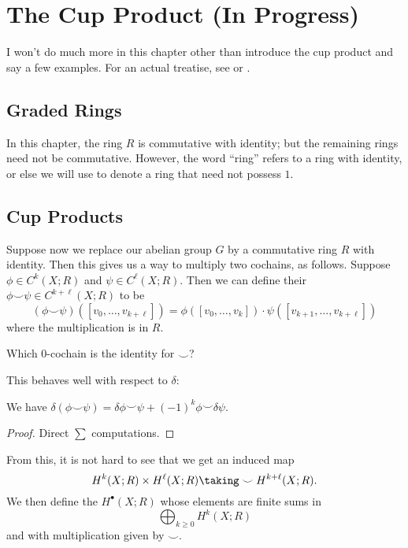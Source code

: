 \chapter{The Cup Product (In Progress)}
I won't do much more in this chapter other than
introduce the cup product and say a few examples.
For an actual treatise, see \cite{ref:hatcher} or \cite{ref:maxim752}.

\section{Graded Rings}
In this chapter, the ring $R$ is commutative with identity;
but the remaining rings need not be commutative.
However, the word ``ring'' refers to a ring with identity,
or else we will use  to denote a ring that need not possess $1$.



\section{Cup Products}
Suppose now we replace our abelian group $G$ by a commutative ring $R$ with identity.
Then this gives us a way to multiply two cochains, as follows.
Suppose $\phi \in C^k(X;R)$ and $\psi \in C^\ell(X;R)$.
Then we can define their 
$\phi\smile\psi \in C^{k+\ell}(X;R)$ to be
\[
	(\phi\smile\psi)([v_0, \dots, v_{k+\ell}])
	= \phi\left( [v_0, \dots, v_k] \right)
	\cdot \psi\left( [v_{k+1}, \dots, v_{k+\ell}] \right)
\]
where the multiplication is in $R$.

\begin{ques}
	Which $0$-cochain is the identity for $\smile$?
\end{ques}

This behaves well with respect to $\delta$:
\begin{lemma}
	We have
	$\delta(\phi\smile\psi) = \delta\phi\smile\psi + (-1)^k\phi\smile\delta\psi$.
\end{lemma}
\begin{proof}
	Direct $\sum$ computations.
\end{proof}
From this, it is not hard to see that we get an induced map
\[ H^k(X;R) \times H^\ell(X;R) \taking\smile H^{k+\ell}(X;R).  \]
We then define the  $H^\bullet(X;R)$
whose elements are finite sums in 
\[ \bigoplus_{k \ge 0} H^k(X;R) \]
and with multiplication given by $\smile$.

